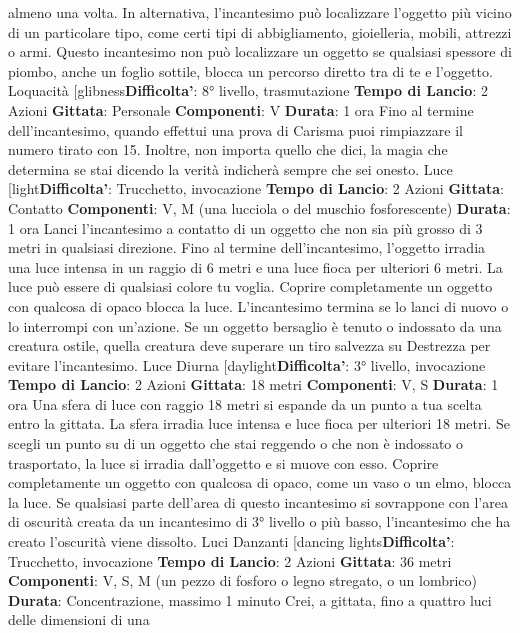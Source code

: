 \begin{multicols}{2}
almeno una volta. In alternativa, l’incantesimo può
localizzare l’oggetto più vicino di un particolare tipo,
come certi tipi di abbigliamento, gioielleria, mobili,
attrezzi o armi.
Questo incantesimo non può localizzare un oggetto se
qualsiasi spessore di piombo, anche un foglio sottile,
blocca un percorso diretto tra di te e l’oggetto.
Loquacità
[glibness\textbf{Difficolta'}:
8° livello, trasmutazione
\textbf{Tempo di Lancio}: 2 Azioni
\textbf{Gittata}: Personale
\textbf{Componenti}: V
\textbf{Durata}: 1 ora
Fino al termine dell’incantesimo, quando effettui una
prova di Carisma puoi rimpiazzare il numero tirato con
15. Inoltre, non importa quello che dici, la magia che
determina se stai dicendo la verità indicherà sempre
che sei onesto.
Luce
[light\textbf{Difficolta'}:
Trucchetto, invocazione
\textbf{Tempo di Lancio}: 2 Azioni
\textbf{Gittata}: Contatto
\textbf{Componenti}: V, M (una lucciola o del muschio
fosforescente)
\textbf{Durata}: 1 ora
Lanci l’incantesimo a contatto di un oggetto che non sia
più grosso di 3 metri in qualsiasi direzione. Fino al
termine dell’incantesimo, l’oggetto irradia una luce
intensa in un raggio di 6 metri e una luce fioca per
ulteriori 6 metri. La luce può essere di qualsiasi colore
tu voglia. Coprire completamente un oggetto con
qualcosa di opaco blocca la luce. L’incantesimo termina
se lo lanci di nuovo o lo interrompi con un’azione.
Se un oggetto bersaglio è tenuto o indossato da una
creatura ostile, quella creatura deve superare un tiro
salvezza su Destrezza per evitare l’incantesimo.
Luce Diurna
[daylight\textbf{Difficolta'}:
3° livello, invocazione
\textbf{Tempo di Lancio}: 2 Azioni
\textbf{Gittata}: 18 metri
\textbf{Componenti}: V, S
\textbf{Durata}: 1 ora
Una sfera di luce con raggio 18 metri si espande da un
punto a tua scelta entro la gittata. La sfera irradia luce
intensa e luce fioca per ulteriori 18 metri.
Se scegli un punto su di un oggetto che stai reggendo o
che non è indossato o trasportato, la luce si irradia
dall’oggetto e si muove con esso. Coprire
completamente un oggetto con qualcosa di opaco,
come un vaso o un elmo, blocca la luce.
Se qualsiasi parte dell’area di questo incantesimo si
sovrappone con l’area di oscurità creata da un
incantesimo di 3° livello o più basso, l’incantesimo che
ha creato l’oscurità viene dissolto.
Luci Danzanti
[dancing lights\textbf{Difficolta'}:
Trucchetto, invocazione
\textbf{Tempo di Lancio}: 2 Azioni
\textbf{Gittata}: 36 metri
\textbf{Componenti}: V, S, M (un pezzo di fosforo o legno
stregato, o un lombrico)
\textbf{Durata}: Concentrazione, massimo 1 minuto
Crei, a gittata, fino a quattro luci delle dimensioni di una

\end{multicols}

